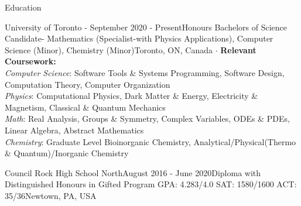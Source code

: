 \documentclass[UTF8]{resume} %
\begin{document}
\begin{rSection}{Education}

\begin{rSubsection}{University of Toronto - }{September 2020 - Present}{Honours Bachelors of Science Candidate- Mathematics (Specialist-with Physics Applications), Computer Science (Minor), Chemistry (Minor)}{Toronto, ON, Canada}
    \scriptsize{
    $\cdot$ \textbf{Relevant Coursework:} \\
    \textit{Computer Science}: Software Tools \& Systems Programming, Software Design, Computation Theory, Computer Organization \\
    \textit{Physics}:  Computational Physics, Dark Matter \& Energy, Electricity \& Magnetism, Classical \& Quantum Mechanics \\
    \textit{Math}: Real Analysis, Groups \& Symmetry, Complex Variables, ODEs \& PDEs, Linear Algebra, Abstract Mathematics\\
    \textit{Chemistry}: Graduate Level Bioinorganic Chemistry, Analytical/Physical(Thermo \& Quantum)/Inorganic Chemistry}
\end{rSubsection}
\begin{rSubsection}{Council Rock High School North}{August 2016 - June 2020}{Diploma with Distinguished Honours in Gifted Program GPA: 4.283/4.0  SAT: 1580/1600  ACT: 35/36}{Newtown, PA, USA}
    \end{rSubsection}
\end{rSection}
\end{document}
